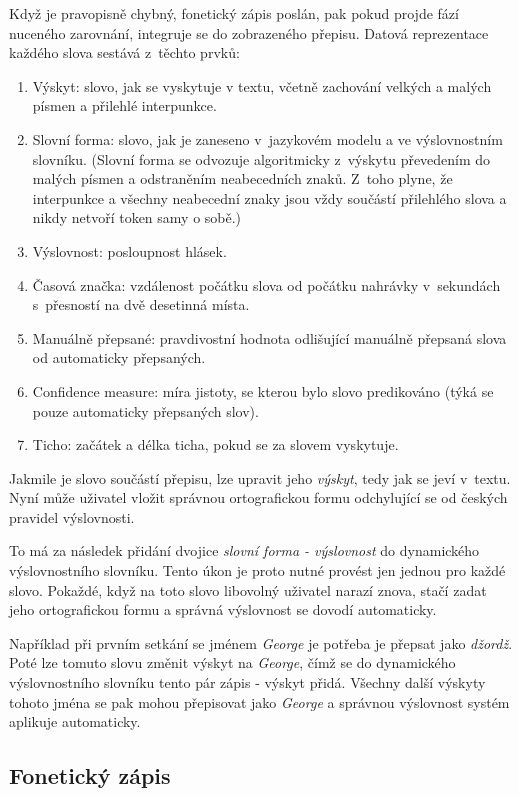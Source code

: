 Když je pravopisně chybný, fonetický zápis poslán, pak pokud projde fází
nuceného zarovnání, integruje se do zobrazeného přepisu. Datová reprezentace
každého slova sestává z~těchto prvků:
\begin{enumerate}
\item{Výskyt:
    slovo, jak se vyskytuje v textu, včetně zachování velkých a malých písmen a
    přilehlé interpunkce.
}
\item{Slovní forma:
    slovo, jak je zaneseno v~jazykovém modelu a ve výslovnostním slovníku.
    (Slovní forma se odvozuje algoritmicky z~výskytu převedením do malých písmen
    a odstraněním neabecedních znaků. Z~toho plyne, že interpunkce a všechny
    neabecední znaky jsou vždy součástí přilehlého slova a nikdy netvoří token
    samy o sobě.)
}
\item{Výslovnost:
    posloupnost hlásek.
}
\item{Časová značka:
    vzdálenost počátku slova od počátku nahrávky v~sekundách s~přesností na dvě
    desetinná místa.
}
\item{Manuálně přepsané:
    pravdivostní hodnota odlišující manuálně přepsaná slova od automaticky
    přepsaných.
}
\item{Confidence measure:
    míra jistoty, se kterou bylo slovo predikováno (týká se pouze automaticky
    přepsaných slov).
}
\item{Ticho:
    začátek a délka ticha, pokud se za slovem vyskytuje.
}
\end{enumerate}
Jakmile je slovo součástí přepisu, lze upravit jeho {\em výskyt}, tedy jak se
jeví v~textu. Nyní může uživatel vložit správnou ortografickou formu odchylující
se od českých pravidel výslovnosti.

To má za následek přidání dvojice {\em slovní forma - výslovnost} do dynamického
výslovnostního slovníku. Tento úkon je proto nutné provést jen jednou pro každé
slovo. Pokaždé, když na toto slovo libovolný uživatel narazí znova, stačí zadat jeho
ortografickou formu a správná výslovnost se dovodí automaticky.

Například při prvním setkání se jménem {\em George} je potřeba je přepsat jako
{\em džordž}. Poté lze tomuto slovu změnit výskyt na {\em George}, čímž se do
dynamického výslovnostního slovníku tento pár zápis - výskyt přidá. Všechny
další výskyty tohoto jména se pak mohou přepisovat jako {\em George} a správnou
výslovnost systém aplikuje automaticky.

\subsection{Fonetický zápis}
\label{ssec:respelling}

